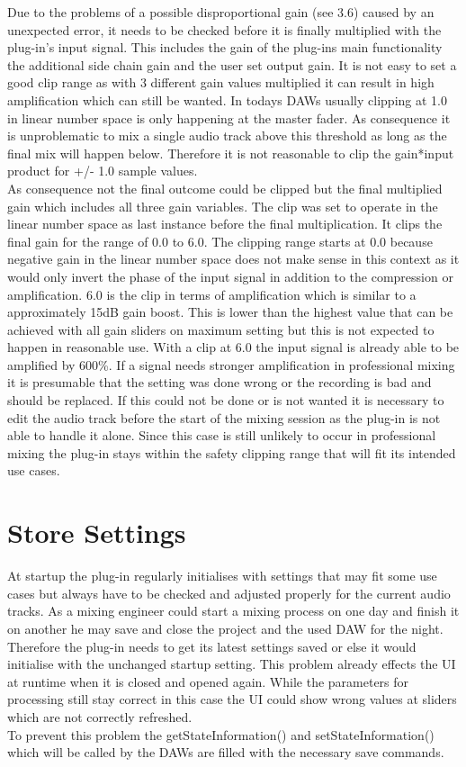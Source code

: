 Due to the problems of a possible disproportional gain (see 3.6) caused by an unexpected error, it needs to be checked before it is finally multiplied with the plug-in’s input signal. This includes the gain of the plug-ins main functionality the additional side chain gain and the user set output gain. It is not easy to set a good clip range as with 3 different gain values multiplied it can result in high amplification which can still be wanted. In todays DAWs usually clipping at 1.0 in linear number space is only happening at the master fader. As consequence it is unproblematic to mix a single audio track above this threshold as long as the final mix will happen below. Therefore it is not reasonable to clip the gain*input product for +/- 1.0 sample values.\\
As consequence not the final outcome could be clipped but the final multiplied gain which includes all three gain variables. The clip was set to operate in the linear number space as last instance before the final multiplication. It clips the final gain for the range of 0.0 to 6.0. The clipping range starts at 0.0 because negative gain in the linear number space does not make sense in this context as it would only invert the phase of the input signal in addition to the compression or amplification. 6.0 is the clip in terms of amplification which is similar to a approximately 15dB gain boost. This is lower than the highest value that can be achieved with all gain sliders on maximum setting but this is not expected to happen in reasonable use. With a clip at 6.0 the input signal is already able to be amplified by 600\%. If a signal needs stronger amplification in professional mixing it is presumable that the setting was done wrong or the recording is bad and should be replaced. If this could not be done or is not wanted it is necessary to edit the audio track before the start of the mixing session as the plug-in is not able to handle it alone. Since this case is still unlikely to occur in professional mixing the plug-in stays within the safety clipping range that will fit its intended use cases.\\

\section{Store Settings}

At startup the plug-in regularly initialises with settings that may fit some use cases but always have to be checked and adjusted properly for the current audio tracks. As a mixing engineer could start a mixing process on one day and finish it on another he may save and close the project and the used DAW for the night. Therefore the plug-in needs to get its latest settings saved or else it would initialise with the unchanged startup setting. This problem already effects the UI at runtime when it is closed and opened again. While the parameters for processing still stay correct in this case the UI could show wrong values at sliders which are not correctly refreshed.\\
To prevent this problem the getStateInformation() and setStateInformation() which will be called by the DAWs are filled with the necessary save commands.\\

